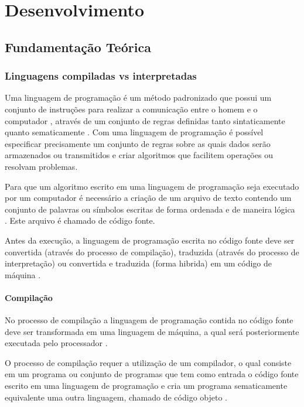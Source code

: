 \part{Desenvolvimento}

\chapter[Fundamentação Teórica]{Fundamentação Teórica}

\section{Linguagens compiladas vs interpretadas}

Uma linguagem de programação é um método padronizado que possui
 um conjunto de instruções para realizar a comunicação entre o homem
 e o computador \cite{ref1}, através de um conjunto de regras
 definidas tanto sintaticamente quanto sematicamente \cite{ref2}.
 Com uma linguagem
 de programação é possível especificar precisamente um conjunto de regras
 sobre  as quais dados serão armazenados ou transmitidos e criar algoritmos
 que facilitem operações ou resolvam problemas.
    
Para que um algoritmo escrito em uma linguagem de programação seja executado 
por um computador é necessário a criação de um arquivo de texto contendo um 
conjunto de palavras ou símbolos escritas de forma ordenada  e de maneira 
lógica \cite{ref3}. Este arquivo é chamado de código fonte.
    
Antes da execução, a linguagem de programação escrita no código fonte deve
 ser convertida (através do processo de compilação), traduzida (através do 
processo de interpretação) ou convertida e traduzida (forma hibrida) em um 
código de máquina \cite{ref4}.

\subsection{Compilação}

No processo de compilação a linguagem de programação contida no código fonte
 deve ser transformada em uma linguagem de máquina, a qual será posteriormente
 executada pelo processador \cite{ref2}. 

O processo de compilação requer a utilização de um compilador, o qual consiste
 em um programa ou conjunto de programas  que tem como entrada o código fonte 
escrito em uma linguagem de programação e cria um programa sematicamente 
equivalente uma outra linguagem, chamado de código objeto \cite{ref4}.

